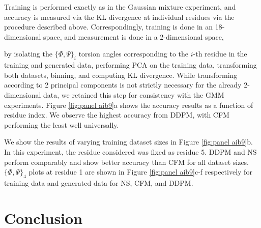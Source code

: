 \documentclass[%
 aip,
 amsmath,amssymb,
 reprint,%
]{revtex4-1}
\begin{document}
Training is performed exactly as in the Gaussian mixture experiment, and accuracy is measured via the KL divergence at individual residues via the procedure described above. Correspondingly, training is done in an 18-dimensional space, and measurement is done in a 2-dimensional space, {by isolating the $\{ \Phi,\Psi \}_i$ torsion angles corresponding to the $i$-th residue in the training and generated data, performing PCA on the training data, transforming both datasets, binning, and computing KL divergence. While transforming according to 2 principal components is not strictly necessary for the already 2-dimensional data, we retained this step for consistency with the GMM experiments. Figure \ref{fig:panel aib9}a shows the accuracy results as a function of residue index. We observe the highest accuracy from DDPM, with CFM performing the least well universally.

We show the results of varying training dataset sizes in Figure \ref{fig:panel aib9}b. In this experiment, the residue considered was fixed as residue 5. DDPM and NS perform comparably and show better accuracy than CFM for all dataset sizes. $\{ \Phi,\Psi \}_4$ plots at residue 1 are shown in Figure \ref{fig:panel aib9}c-f respectively for training data and generated data for NS, CFM, and DDPM.

\section{Conclusion}
\label{sec:conclusion}

}
\end{document}
